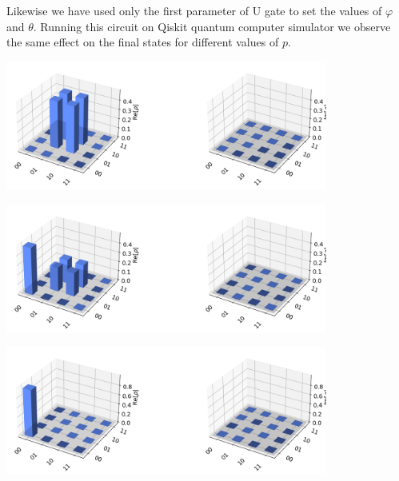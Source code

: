 \documentclass[a4paper, onecolumn]{article}
\begin{document}
		Likewise we have used only the first parameter of U gate to set the values of $\varphi$ and $\theta$. Running this circuit on Qiskit quantum computer simulator we observe the same effect on the final states for different values of $p$.

		\begin{center}
			\includegraphics[width=300pt]{img/dm_p0_v1.png}
			\label{dm_p0}
		\end{center}

		\begin{center}
			\includegraphics[width=300pt]{img/dm_p0.5_v1.png}
			\label{dm_p0.5}
		\end{center}

		\begin{center}
			\includegraphics[width=300pt]{img/dm_p1_v1.png}
			\label{dm_p1}
		\end{center}
\end{document}
